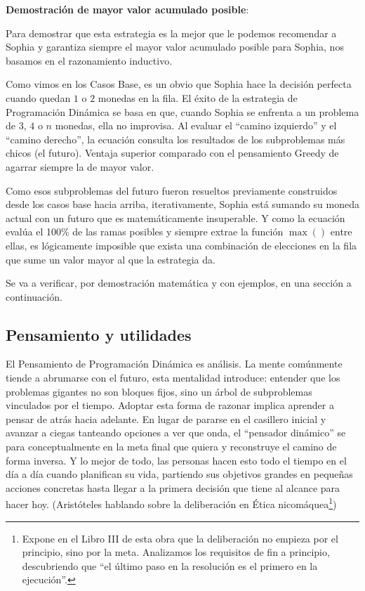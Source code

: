 \noindent \textbf{Demostración de mayor valor acumulado posible}:

Para demostrar que esta estrategia es la mejor que le podemos recomendar a Sophia y garantiza siempre el mayor valor acumulado posible para Sophia, nos basamos en el razonamiento inductivo. 

Como vimos en los Casos Base, es un obvio que Sophia hace la decisión perfecta cuando quedan $1$ o $2$ monedas en la fila. El éxito de la estrategia de Programación Dinámica se basa en que, cuando Sophia se enfrenta a un problema de $3$, $4$ o $n$ monedas, ella no improvisa. Al evaluar el ``camino izquierdo'' y el ``camino derecho'', la ecuación consulta los resultados de los subproblemas más chicos (el futuro). Ventaja superior comparado con el pensamiento Greedy de agarrar siempre la de mayor valor.

Como esos subproblemas del futuro fueron resueltos previamente construidos desde los casos base hacia arriba, iterativamente, Sophia está sumando su moneda actual con un futuro que es matemáticamente insuperable. Y como la ecuación evalúa el 100\% de las ramas posibles y siempre extrae la función $\max()$ entre ellas, es lógicamente imposible que exista una combinación de elecciones en la fila que sume un valor mayor al que la estrategia da.

Se va a verificar, por demostración matemática y con ejemplos, en una sección a continuación.

\subsection{Pensamiento y utilidades} %

El Pensamiento de Programación Dinámica es análisis. La mente comúnmente tiende a abrumarse con el futuro, esta mentalidad introduce: entender que los problemas gigantes no son bloques fijos, sino un árbol de subproblemas vinculados por el tiempo. 
Adoptar esta forma de razonar implica aprender a pensar de atrás hacia adelante. En lugar de pararse en el casillero inicial y avanzar a ciegas tanteando opciones a ver que onda, el ``pensador dinámico'' se para conceptualmente en la meta final que quiera y reconstruye el camino de forma inversa. Y lo mejor de todo, las personas hacen esto todo el tiempo en el día a día cuando planifican su vida, partiendo sus objetivos grandes en pequeñas acciones concretas hasta llegar a la primera decisión que tiene al alcance para hacer hoy. (Aristóteles hablando sobre la deliberación en Ética nicomáquea\footnote{Expone en el Libro III de esta obra que la deliberación no empieza por el principio, sino por la meta. Analizamos los requisitos de fin a principio, descubriendo que ``el último paso en la resolución es el primero en la ejecución''.})

